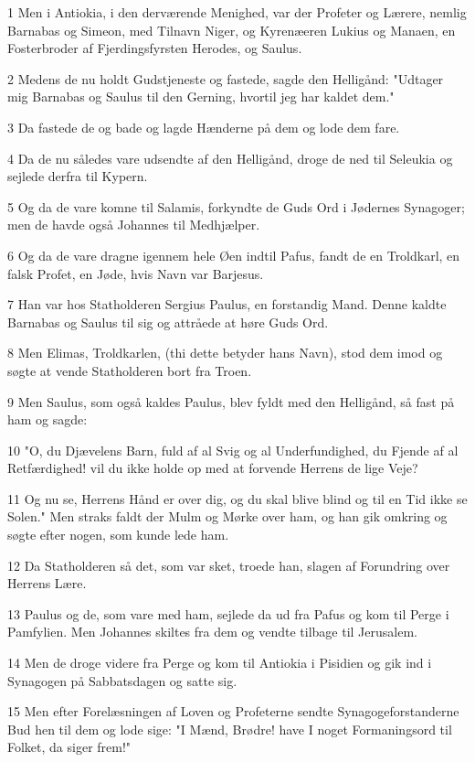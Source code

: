 \par 1 Men i Antiokia, i den derværende Menighed, var der Profeter og Lærere, nemlig Barnabas og Simeon, med Tilnavn Niger, og Kyrenæeren Lukius og Manaen, en Fosterbroder af Fjerdingsfyrsten Herodes, og Saulus.
\par 2 Medens de nu holdt Gudstjeneste og fastede, sagde den Helligånd: "Udtager mig Barnabas og Saulus til den Gerning, hvortil jeg har kaldet dem."
\par 3 Da fastede de og bade og lagde Hænderne på dem og lode dem fare.
\par 4 Da de nu således vare udsendte af den Helligånd, droge de ned til Seleukia og sejlede derfra til Kypern.
\par 5 Og da de vare komne til Salamis, forkyndte de Guds Ord i Jødernes Synagoger; men de havde også Johannes til Medhjælper.
\par 6 Og da de vare dragne igennem hele Øen indtil Pafus, fandt de en Troldkarl, en falsk Profet, en Jøde, hvis Navn var Barjesus.
\par 7 Han var hos Statholderen Sergius Paulus, en forstandig Mand. Denne kaldte Barnabas og Saulus til sig og attråede at høre Guds Ord.
\par 8 Men Elimas, Troldkarlen, (thi dette betyder hans Navn), stod dem imod og søgte at vende Statholderen bort fra Troen.
\par 9 Men Saulus, som også kaldes Paulus, blev fyldt med den Helligånd, så fast på ham og sagde:
\par 10 "O, du Djævelens Barn, fuld af al Svig og al Underfundighed, du Fjende af al Retfærdighed! vil du ikke holde op med at forvende Herrens de lige Veje?
\par 11 Og nu se, Herrens Hånd er over dig, og du skal blive blind og til en Tid ikke se Solen." Men straks faldt der Mulm og Mørke over ham, og han gik omkring og søgte efter nogen, som kunde lede ham.
\par 12 Da Statholderen så det, som var sket, troede han, slagen af Forundring over Herrens Lære.
\par 13 Paulus og de, som vare med ham, sejlede da ud fra Pafus og kom til Perge i Pamfylien. Men Johannes skiltes fra dem og vendte tilbage til Jerusalem.
\par 14 Men de droge videre fra Perge og kom til Antiokia i Pisidien og gik ind i Synagogen på Sabbatsdagen og satte sig.
\par 15 Men efter Forelæsningen af Loven og Profeterne sendte Synagogeforstanderne Bud hen til dem og lode sige: "I Mænd, Brødre! have I noget Formaningsord til Folket, da siger frem!"
